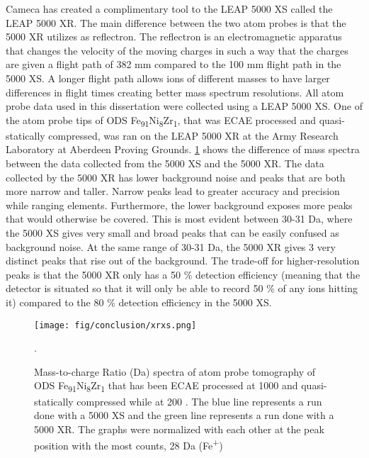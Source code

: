 		Cameca has created a complimentary tool to the LEAP 5000 XS called the LEAP 5000 XR. The main difference between the two atom probes is that the 5000 XR utilizes as reflectron. The reflectron is an electromagnetic apparatus that changes the velocity of the moving charges in such a way that the charges are given a flight path of 382 mm compared to the 100 mm flight path in the 5000 XS. A longer flight path allows ions of different masses to have larger differences in flight times creating better mass spectrum resolutions. All atom probe data used in this dissertation were collected using a LEAP 5000 XS. One of the atom probe tips of ODS Fe\textsubscript{91}Ni\textsubscript{8}Zr\textsubscript{1}, that was ECAE processed and quasi-statically compressed, was ran on the LEAP 5000 XR at the Army Research Laboratory at Aberdeen Proving Grounds. \ref{fig:xrxs} shows the difference of mass spectra between the data collected from the 5000 XS and the 5000 XR. The data collected by the 5000 XR has lower background noise and peaks that are both more narrow and taller. Narrow peaks lead to greater accuracy and precision while ranging elements. Furthermore, the lower background exposes more peaks that would otherwise be covered. This is most evident between 30-31 Da, where the 5000 XS gives very small and broad peaks that can be easily confused as background noise. At the same range of 30-31 Da, the 5000 XR gives 3 very distinct peaks that rise out of the background. The trade-off for higher-resolution peaks is that the 5000 XR only has a 50 $\%$  detection efficiency (meaning that the detector is situated so that it will only be able to record 50 $\%$  of any ions hitting it) compared to the 80 $\%$  detection efficiency in the 5000 XS. 
		
		\begin{figure}
			\centering
			\texttt{[image: fig/conclusion/xrxs.png]}
			\caption[Mass-to-charge Ratio (Da) spectra of atom probe tomography of ODS\textbf{ }Fe\textsubscript{91}Ni\textsubscript{8}Zr\textsubscript{1} that has been ECAE processed at 1000 \celsius{} and quasi-statically compressed while at 200 \celsius{}.]{Mass-to-charge Ratio (Da) spectra of atom probe tomography of ODS\textbf{ }Fe\textsubscript{91}Ni\textsubscript{8}Zr\textsubscript{1} that has been ECAE processed at 1000 \celsius{} and quasi-statically compressed while at 200 \celsius{}. The blue line represents a run done with a 5000 XS and the green line represents a run done with a 5000 XR. The graphs were normalized with each other at the peak position with the most counts, 28 Da (Fe\textsuperscript{+})}.
			\label{fig:xrxs}
		\end{figure}
		
